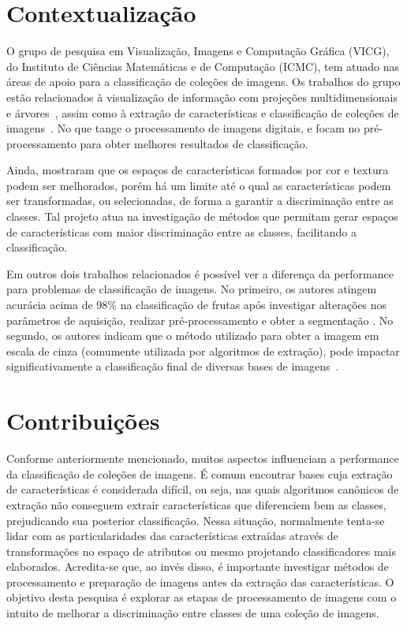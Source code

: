 \section{Contextualização}

O grupo de pesquisa em Visualização, Imagens e Computação Gráfica (VICG), do Instituto de Ciências Matemáticas e de Computação (ICMC), tem atuado nas áreas de apoio para a classificação de coleções de imagens. Os trabalhos do grupo estão relacionados à visualização de informação com projeções multidimensionais e árvores~\cite{Joia2011}, assim como à extração de características e classificação de coleções de imagens~\cite{Paiva2011}. No que tange o processamento de imagens digitais,  e  focam no pré-processamento para obter melhores resultados de classificação.

Ainda,  mostraram que os espaços de características formados por cor e textura podem ser melhorados, porém há um limite até o qual as características podem ser transformadas, ou selecionadas, de forma a garantir a discriminação entre as classes. Tal projeto atua na investigação de métodos que permitam gerar espaços de características com maior discriminação entre as classes, facilitando a classificação.

Em outros dois trabalhos relacionados é possível ver a diferença da performance para problemas de classificação de imagens. No primeiro, os autores atingem acurácia acima de 98\% na classificação de frutas após investigar alterações nos parâmetros de aquisição, realizar pré-processamento e obter a segmentação \cite{Rocha2010}. No segundo, os autores indicam que o método utilizado para obter a imagem em escala de cinza (comumente utilizada por algoritmos de extração), pode impactar significativamente a classificação final de diversas bases de imagens~\cite{Kanan2012}.

\section{Contribuições}

Conforme anteriormente mencionado, muitos aspectos influenciam a performance da classificação de coleções de imagens. É comum encontrar bases cuja extração de características é considerada difícil, ou seja, nas quais algoritmos canônicos de extração não conseguem extrair características que diferenciem bem as classes, prejudicando sua posterior classificação. Nessa situação, normalmente tenta-se lidar com as particularidades das características extraídas através de transformações no espaço de atributos ou mesmo projetando classificadores mais elaborados. Acredita-se que, ao invés disso, é importante investigar métodos de processamento e preparação de imagens antes da extração das características.
O objetivo desta pesquisa é explorar as etapas de processamento de imagens com o intuito de melhorar a discriminação entre classes de uma coleção de imagens.

